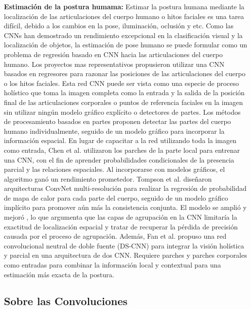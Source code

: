 \textbf{Estimación de la postura humama:}  Estimar la postura humana mediante la localización de las articulaciones del cuerpo humano o hitos faciales es una tarea difícil, debido a los cambios en la pose, iluminación, oclusión y etc. Como las CNNs han demostrado un rendimiento excepcional en la clasificación visual y la localización de objetos, la estimación de pose humano se puede formular como un problema de regresión basado en CNN hacia las articulaciones del cuerpo humano. Los proyectos mas representativos \cite{Toshev,Li} propusieron utilizar una  CNN basados en regresores para razonar las posiciones de las articulaciones del cuerpo o los hitos faciales.  Esta red CNN   puede ser vista como una especie de proceso holístico que toma la imagen completa como la entrada y la salida de la posición final de las articulaciones corporales o puntos de referencia faciales en la imagen sin utilizar ningún modelo gráfico explícito o detectores de partes. Los métodos de procesamiento basados en partes proponen detectar las partes del cuerpo humano individualmente, seguido de un modelo gráfico para incorporar la información espacial. En lugar de capacitar a la red utilizando toda la imagen como entrada, Chen et al.  \cite{ChenX} utilizaron los parches de la parte local para entrenar una CNN, con el fin de aprender probabilidades condicionales de la presencia parcial y las relaciones espaciales. Al incorporarse con modelos gráficos, el algoritmo ganó un rendimiento prometedor. Tompson et al. \cite{Tompson} diseñaron arquitecturas ConvNet multi-resolución para realizar la regresión de probabilidad de mapa de calor para cada parte del cuerpo, seguido de un modelo gráfico implícito para promover aún más la consistencia conjunta. El modelo se amplió y mejoró  \cite{Tompson}, lo que argumenta que las capas de agrupación en la CNN limitaría la exactitud de localización espacial y tratar de recuperar la pérdida de precisión causada por el proceso de agrupación. Además, Fan et al.  \cite{Fan} propuso una red convolucional neutral de doble fuente (DS-CNN) para integrar la visión holística y parcial en una arquitectura de dos CNN. Requiere parches y parches corporales como entradas para combinar la información local y contextual para una estimación más exacta de la postura.

\subsection{Sobre las Convoluciones}

